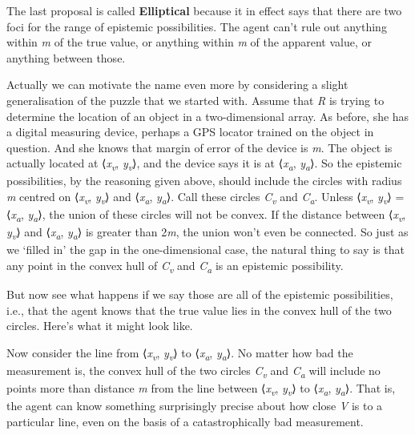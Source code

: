 \documentclass[
  10pt,
  letterpaper,
  DIV=11,
  numbers=noendperiod,
  twoside]{scrartcl}
\begin{document}
The last proposal is called \textbf{Elliptical} because it in effect
says that there are two foci for the range of epistemic possibilities.
The agent can't rule out anything within \emph{m} of the true value, or
anything within \emph{m} of the apparent value, or anything between
those.

Actually we can motivate the name even more by considering a slight
generalisation of the puzzle that we started with. Assume that \emph{R}
is trying to determine the location of an object in a two-dimensional
array. As before, she has a digital measuring device, perhaps a GPS
locator trained on the object in question. And she knows that margin of
error of the device is \emph{m}. The object is actually located at
⟨\emph{x\textsubscript{v}}, \emph{y\textsubscript{v}}⟩, and the device
says it is at ⟨\emph{x\textsubscript{a}}, \emph{y\textsubscript{a}}⟩. So
the epistemic possibilities, by the reasoning given above, should
include the circles with radius \emph{m} centred on
⟨\emph{x\textsubscript{v}}, \emph{y\textsubscript{v}}⟩ and
⟨\emph{x\textsubscript{a}}, \emph{y\textsubscript{a}}⟩. Call these
circles \emph{C\textsubscript{v}} and \emph{C\textsubscript{a}}. Unless
⟨\emph{x\textsubscript{v}}, \emph{y\textsubscript{v}}⟩ =
⟨\emph{x\textsubscript{a}}, \emph{y\textsubscript{a}}⟩, the union of
these circles will not be convex. If the distance between
⟨\emph{x\textsubscript{v}}, \emph{y\textsubscript{v}}⟩ and
⟨\emph{x\textsubscript{a}}, \emph{y\textsubscript{a}}⟩ is greater than
2\emph{m}, the union won't even be connected. So just as we `filled in'
the gap in the one-dimensional case, the natural thing to say is that
any point in the convex hull of \emph{C\textsubscript{v}} and
\emph{C\textsubscript{a}} is an epistemic possibility.

But now see what happens if we say those are all of the epistemic
possibilities, i.e., that the agent knows that the true value lies in
the convex hull of the two circles. Here's what it might look like.

Now consider the line from ⟨\emph{x\textsubscript{v}},
\emph{y\textsubscript{v}}⟩ to ⟨\emph{x\textsubscript{a}},
\emph{y\textsubscript{a}}⟩. No matter how bad the measurement is, the
convex hull of the two circles \emph{C\textsubscript{v}} and
\emph{C\textsubscript{a}} will include no points more than distance
\emph{m} from the line between ⟨\emph{x\textsubscript{v}},
\emph{y\textsubscript{v}}⟩ to ⟨\emph{x\textsubscript{a}},
\emph{y\textsubscript{a}}⟩. That is, the agent can know something
surprisingly precise about how close \emph{V} is to a particular line,
even on the basis of a catastrophically bad measurement.
\end{document}
